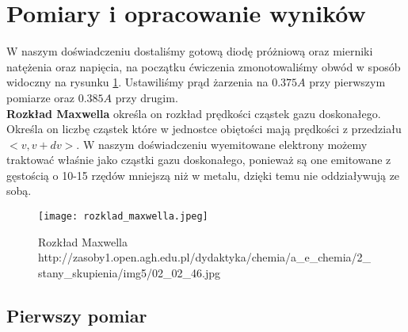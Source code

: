 \documentclass[a4paper]{article}
\newlength{\du}
\begin{document}
\section{Pomiary i opracowanie wyników}
W naszym doświadczeniu dostaliśmy gotową diodę próżniową oraz mierniki natężenia oraz napięcia, na początku ćwiczenia zmonotowaliśmy obwód w sposób widoczny na rysunku \ref{schemat}. Ustawiliśmy prąd żarzenia na $0.375 A$ przy pierwszym pomiarze oraz $0.385 A$ przy drugim. 
\\ \textbf{Rozkład Maxwella} określa on rozkład prędkości cząstek gazu doskonałego. Określa on liczbę cząstek które w jednostce obiętości mają prędkości z przedziału $<v, v + dv>$. W naszym doświadczeniu wyemitowane elektrony możemy traktować właśnie jako cząstki gazu doskonałego, ponieważ są one emitowane z gęstością o 10-15 rzędów mniejszą niż w metalu, dzięki temu nie oddziaływują ze sobą. 
\begin{figure}
\centering
\texttt{[image: rozklad\_maxwella.jpeg]}
\caption{Rozkład Maxwella http://zasoby1.open.agh.edu.pl/dydaktyka/chemia/a_e_chemia/2_stany_skupienia/img5/02_02_46.jpg}
\label{schemat}
\end{figure}

\subsection{Pierwszy pomiar}
\end{document}
